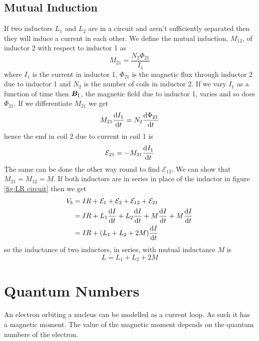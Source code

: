 \documentclass{article}
\newcommand{\emf}{\mathcal{E}}
\begin{document}
    \subsection{Mutual Induction}
    If two inductors \(L_1\) and \(L_2\) are in a circuit and aren't sufficiently separated then they will induce a current in each other.
    We define the mutual induction, \(M_{12}\), of inductor 2 with respect to inductor 1 as
    \[M_{21} = \frac{N_2\Phi_{21}}{I_1}\]
    where \(I_1\) is the current in inductor 1, \(\Phi_{21}\) is the magnetic flux through inductor 2 due to inductor 1 and \(N_2\) is the number of coils in inductor 2.
    If we vary \(I_1\) as a function of time then \(\bm{B}_1\), the magnetic field due to inductor 1, varies and so does \(\Phi_{21}\).
    If we differentiate \(M_{21}\) we get
    \[M_{21}\dv{I_1}{t} = N_2\dv{\Phi_{21}}{t}\]
    hence the emf in coil 2 due to current in coil 1 is
    \[\emf_{21} = -M_{21}\dv{I_1}{t}\]
    The same can be done the other way round to find \(\emf_{12}\).
    We can show that \(M_{21} = M_{12} = M\).
    If both inductors are in series in place of the inductor in figure \ref{fig:LR circuit} then we get
    \begin{align*}
        V_b &= IR + \emf_1 + \emf_2 + \emf_{12} + \emf_{21}\\
        &= IR + L_1\dv{I}{t} + L_2\dv{I}{t} + M\dv{I}{t}  + M\dv{I}{t}\\
        &= IR + (L_1 + L_2 + 2M)\dv{I}{t}
    \end{align*}
    so the inductance of two inductors, in series, with mutual inductance \(M\) is
    \[L = L_1 + L_2 + 2M\]
    
    \section{Quantum Numbers}
    An electron orbiting a nucleus can be modelled as a current loop.
    As such it has a magnetic moment.
    The value of the magnetic moment depends on the quantum numbers of the electron.
    
\end{document}
